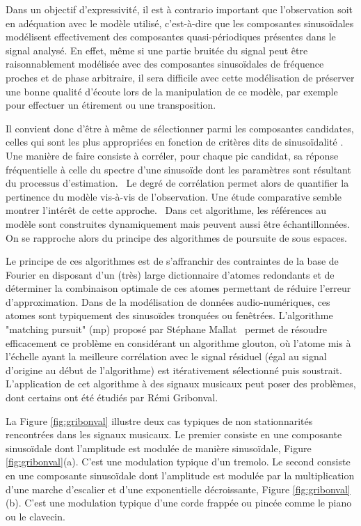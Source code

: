 Dans un objectif d'expressivité, il est à contrario important que l'observation  soit en adéquation avec le modèle utilisé, c'est-à-dire que les composantes sinusoïdales modélisent effectivement des composantes quasi-périodiques présentes dans le signal analysé. En effet, même si une partie bruitée du signal peut être raisonnablement modélisée avec des composantes sinusoïdales de fréquence proches et de phase arbitraire, il sera difficile avec cette modélisation de préserver une bonne qualité d'écoute lors de la manipulation de ce modèle, par exemple pour effectuer un étirement ou une transposition.

Il convient donc d'être à même de sélectionner parmi les composantes candidates, celles qui sont les plus appropriées en fonction de critères dits de \og sinusoïdalité \fg. Une manière de faire consiste à corréler, pour chaque pic candidat, sa réponse fréquentielle à celle du spectre d'une sinusoïde dont les paramètres sont résultant du processus d'estimation.~\cite{peak-selection} Le degré de corrélation permet alors de quantifier la pertinence du modèle vis-à-vis de l'observation. Une étude comparative semble montrer l'intérêt de cette approche.~\cite{wells2010comparative} Dans cet algorithme, les références au modèle sont construites dynamiquement mais peuvent aussi être échantillonnées. On se rapproche alors du principe des algorithmes de poursuite de sous espaces.

Le principe de ces algorithmes est de s'affranchir des contraintes de la base de Fourier en disposant d'un (très) large dictionnaire d'atomes redondants et de déterminer la combinaison optimale de ces atomes permettant de réduire l'erreur d'approximation. Dans de la modélisation de données audio-numériques, ces atomes sont typiquement des sinusoïdes tronquées ou fenêtrées. L'algorithme "matching pursuit" (mp) proposé par Stéphane Mallat~\cite{mallat1993matching} permet de résoudre efficacement ce problème en considérant un algorithme glouton, où l'atome mis à l'échelle ayant la meilleure corrélation avec le signal résiduel (égal au signal d'origine au début de l'algorithme) est itérativement sélectionné puis soustrait. L'application de cet algorithme à des signaux musicaux peut poser des problèmes, dont certains ont été étudiés par Rémi Gribonval.~\cite{gribonval1996sound} %

La Figure \ref{fig:gribonval} illustre deux cas typiques de non stationnarités rencontrées dans les signaux musicaux. Le premier consiste en une composante sinusoïdale dont l'amplitude est modulée de manière sinusoïdale, Figure \ref{fig:gribonval}(a). C'est une modulation typique d'un tremolo. Le second consiste en une composante sinusoïdale dont l'amplitude est modulée par la multiplication d'une marche d'escalier et d'une exponentielle décroissante, Figure \ref{fig:gribonval}(b). C'est une modulation typique d'une corde frappée ou pincée comme le piano ou le clavecin.



